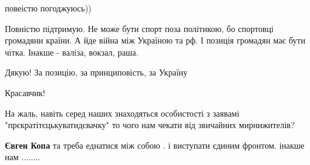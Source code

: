\begin{itemize}
 
повеістю погоджуюсь))

 

Повністю підтримую. Не може бути спорт поза політикою, бо спортовці громадяни
країни. А йде війна між Україною та рф. І позиція громадян має бути чітка.
Інакше - валіза, вокзал, раша.


 

Дякую! За позицію, за принциповість, за Україну 

 
Красавчик!

 
На жаль, навіть серед наших знаходяться особистості з заявамі
"прєкратітєцькуватидєвачку" то чого нам чекати від звичайних мирнижителів?

\begin{itemize}
 
\textbf{Євген Копа} та треба еднатися між собою . і виступати єдиним фронтом. інакше нам ........
\end{itemize}


\end{itemize}

